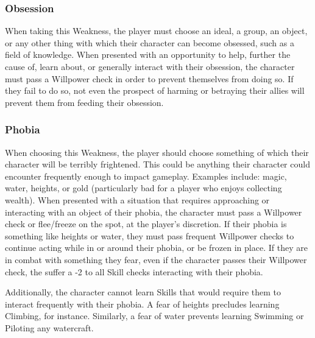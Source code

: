 \documentclass[oneside]{book}
\newcommand{\comment}[1]{}
\begin{document}
\begin{multicols}{2}
\subsubsection{Obsession}
When taking this Weakness, the player must choose an ideal, a group, an object, or any other thing with which their character can become obsessed, such as a field of knowledge. When presented with an opportunity to help, further the cause of, learn about, or generally interact with their obsession, the character must pass a Willpower check in order to prevent themselves from doing so. If they fail to do so, not even the prospect of harming or betraying their allies will prevent them from feeding their obsession. 

\subsubsection{Phobia}
When choosing this Weakness, the player should choose something of which their character will be terribly frightened. This could be anything their character could encounter frequently enough to impact gameplay. Examples include: magic, water, heights, or gold (particularly bad for a player who enjoys collecting wealth). When presented with a situation that requires approaching or interacting with an object of their phobia, the character must pass a Willpower check or flee/freeze on the spot, at the player's discretion. If their phobia is something like heights or water, they must pass frequent Willpower checks to continue acting while in or around their phobia, or be frozen in place. If they are in combat with something they fear, even if the character passes their Willpower check, the suffer a -2 to all Skill checks interacting with their phobia.

Additionally, the character cannot learn Skills that would require them to interact frequently with their phobia. A fear of heights precludes learning Climbing, for instance. Similarly, a fear of water prevents learning Swimming or Piloting any watercraft.

\comment{ 
\subsubsection{Shifty}
The character lacks certain social cues or acts in a manner that lends them an air of deceit. This could be the result of a poor childhood, past trauma, or years spent shut in a library with only tomes for company. On any Persuasion, Fast Talk, or Seduce checks, the character's level of Success is being treated as one lower (a Green Success is still a Green Success, however). 
}


\end{multicols}
\end{document}
